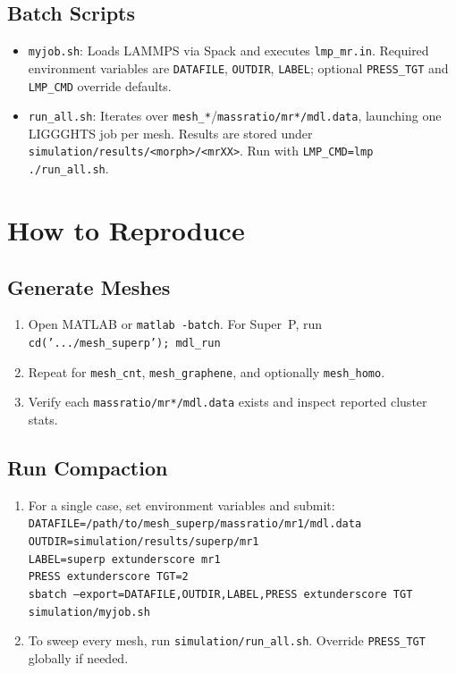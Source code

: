 \documentclass[11pt]{article}
\begin{document}
\subsection{Batch Scripts}
\begin{itemize}
    \item \texttt{myjob.sh}: Loads LAMMPS via Spack and executes \texttt{lmp\_mr.in}. Required environment variables are \texttt{DATAFILE}, \texttt{OUTDIR}, \texttt{LABEL}; optional \texttt{PRESS\_TGT} and \texttt{LMP\_CMD} override defaults.
    \item \texttt{run\_all.sh}: Iterates over \texttt{mesh\_*}/\texttt{massratio/mr*/mdl.data}, launching one LIGGGHTS job per mesh. Results are stored under \texttt{simulation/results/<morph>/<mrXX>}. Run with \texttt{LMP\_CMD=lmp ./run\_all.sh}.
\end{itemize}

\section{How to Reproduce}
\subsection{Generate Meshes}
\begin{enumerate}
    \item Open MATLAB or \texttt{matlab -batch}. For Super~P, run \\ 
    \texttt{cd('.../mesh\_superp'); mdl\_run}
    \item Repeat for \texttt{mesh\_cnt}, \texttt{mesh\_graphene}, and optionally \texttt{mesh\_homo}.
    \item Verify each \texttt{massratio/mr*/mdl.data} exists and inspect reported cluster stats.
\end{enumerate}

\subsection{Run Compaction}
\begin{enumerate}
    \item For a single case, set environment variables and submit: \\ 
    \texttt{DATAFILE=/path/to/mesh\_superp/massratio/mr1/mdl.data}\\
    \texttt{OUTDIR=simulation/results/superp/mr1}\\
    \texttt{LABEL=superp	extunderscore mr1}\\
    \texttt{PRESS	extunderscore TGT=2}\\
    \texttt{sbatch --export=DATAFILE,OUTDIR,LABEL,PRESS	extunderscore TGT simulation/myjob.sh}
    \item To sweep every mesh, run \texttt{simulation/run\_all.sh}. Override \texttt{PRESS\_TGT} globally if needed.
\end{enumerate}
\end{document}
